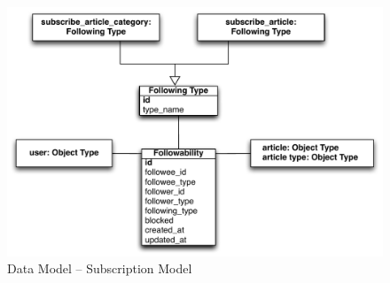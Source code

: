 \begin{figure}[H]
\centering
\includegraphics[width=\textwidth]{img/user2article.pdf}
\caption{Data Model -- Subscription Model}
\label{pic:data:user2article}
\end{figure}

